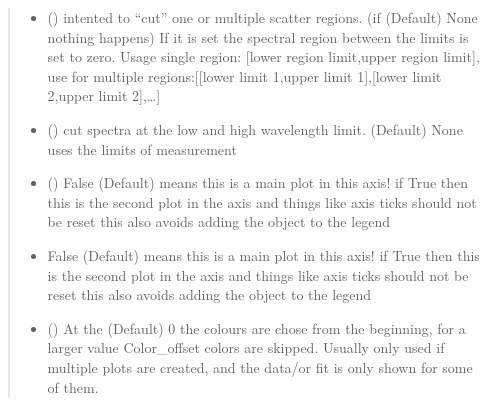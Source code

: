 \documentclass[letterpaper,10pt,english]{sphinxmanual}
\begin{document}
\begin{fulllineitems}
\begin{quote}
\begin{description}
\begin{itemize}
\item {} 
 (\sphinxstyleliteralemphasis{\sphinxupquote{ (}}\sphinxstyleliteralemphasis{\sphinxupquote{, }}\sphinxstyleliteralemphasis{\sphinxupquote{)}}\sphinxstyleliteralemphasis{\sphinxupquote{, }}) \textendash{} intented to “cut” one or multiple scatter regions. (if (Default) None nothing
happens) If it is set the spectral region between the limits is set to zero.
Usage single region: {[}lower region limit,upper region limit{]},
use for multiple regions:{[}{[}lower limit 1,upper limit 1{]},{[}lower limit 2,upper limit 2{]},…{]}

\item {} 
 (\sphinxstyleliteralemphasis{\sphinxupquote{ (}}\sphinxstyleliteralemphasis{\sphinxupquote{)}}\sphinxstyleliteralemphasis{\sphinxupquote{, }}) \textendash{} cut spectra at the low and high wavelength limit. (Default) None
uses the limits of measurement

\item {} 
 () \textendash{} False (Default) means this is a main plot in this axis! if True then this is the second plot in the axis
and things like axis ticks should not be reset
this also avoids adding the object to the legend

\item {} 
 \textendash{} False (Default) means this is a main plot in this axis! if True then this is the second plot in the axis
and things like axis ticks should not be reset
this also avoids adding the object to the legend

\item {} 
 (\sphinxstyleliteralemphasis{\sphinxupquote{, }}) \textendash{} At the (Default) 0 the colours are chose from the beginning, for a larger value Color\_offset
colors are skipped. Usually only used if multiple plots are created, and the data/or fit is
only shown for some of them.


\end{itemize}
\end{description}
\end{quote}
\end{fulllineitems}
\end{document}
